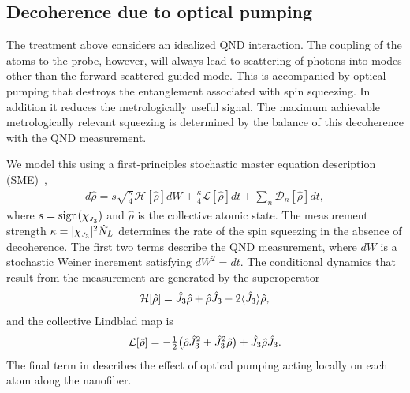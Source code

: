 \documentclass[aps,pra,twocolumn]{revtex4-1} %
\newcommand{\jz}{\hat{J}_3}
\newcommand{\chieff}{\chi_{\raisebox{-.1pt}{\tiny $J_3$}}}
\begin{document}
	\subsection{Decoherence due to optical pumping}\label{sec:decoherence}
	
The treatment above considers an idealized QND interaction. 
The coupling of the atoms to the probe, however, will always lead to scattering of photons into modes other than the forward-scattered guided mode.  
This is accompanied by optical pumping that destroys the entanglement associated with spin squeezing.  In addition it reduces the metrologically useful signal.  
The maximum achievable metrologically relevant squeezing is determined by the balance of this decoherence with the QND measurement. 

We model this using a first-principles stochastic master equation description (SME)~\cite{jacobs_straightforward_2006, baragiola_three-dimensional_2014},
	\begin{align} \label{Eq::SME}
		d \hat{\rho} = s\sqrt{\frac{\kappa}{4}} \mathcal{H}[\hat{\rho}] dW + \frac{\kappa}{4} \mathcal{L}[\hat{\rho}] dt + \sum_n \mathcal{D}_n [\hat{\rho}] dt,
	\end{align}
where $s = {\rm sign}(\chieff)$ and $\hat{\rho}$ is the collective atomic state. 
The measurement strength $\kappa =|\chieff|^2 \dot{N}_L$ determines the rate of the spin squeezing in the absence of decoherence.  
The first two terms describe the QND measurement, where $dW$ is a stochastic Weiner increment satisfying $dW^2 = dt$. 
The conditional dynamics that result from the measurement are generated by the superoperator
	\begin{align}
		\mathcal{H}[\hat{\rho}] = \jz \hat{\rho} + \hat{\rho} \jz - 2 \expt{\jz} \hat{\rho},
	\end{align}
and the collective Lindblad map is
	\begin{align}
		\mathcal{L}[\hat{\rho}] = - \smallfrac{1}{2} \big( \hat{\rho}  \jz^2 + \jz^2 \hat{\rho} \big) + \jz \hat{\rho} \jz.
	\end{align}
The final term in  describes the effect of optical pumping acting locally on each atom along the nanofiber. 
\end{document}

